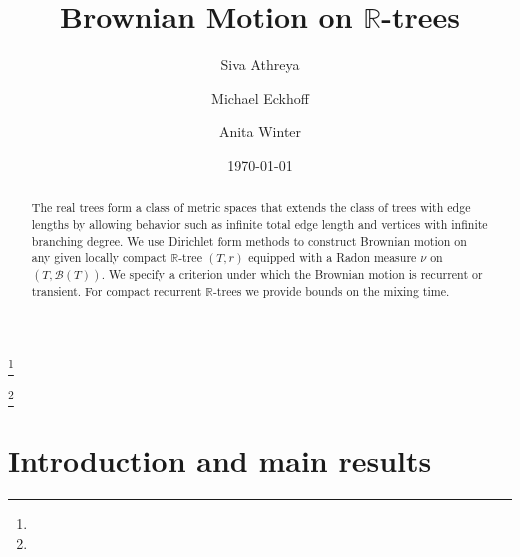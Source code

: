 \documentclass[11pt]{amsart}
\numberwithin{equation}{section}
\begin{document}
\author{Siva Athreya}
\address{Siva Athreya \\ Indian Statistical Institute
8th Mile Mysore Road  \\ Bangalore 560059, India.}
\thanks{}

\author{Michael Eckhoff}

\author{Anita Winter}
\address{Anita Winter\\ Fakult\"at f\"ur Mathematik\\ Universit\"at Duisburg-Essen\\
Universit\"atsstrasse 2\\ 45141 Essen, Germany}
\thanks{}


\title{Brownian Motion on ${{\mathbb R}}$-trees}

\date{\today}

\begin{abstract}
The real trees form a class of metric spaces that extends
the class of trees with edge lengths by allowing behavior such as infinite
total edge length and vertices with infinite branching degree.
We use Dirichlet form methods to construct Brownian motion on any given locally compact
${{\mathbb R}}$-tree {$(T,r)$} equipped with a Radon measure $\nu$ {on $(T,{\mathcal B}(T))$}.
We specify a criterion under which the Brownian motion is recurrent or transient.
For compact recurrent ${{\mathbb R}}$-trees we provide bounds on the mixing time.

\end{abstract}
\maketitle

\section{Introduction and main results}
\label{S:motiv}
\end{document}
